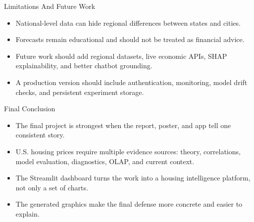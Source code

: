 \documentclass[aspectratio=169]{beamer}
\begin{document}
\begin{frame}{Limitations And Future Work}
\begin{itemize}
  \item National-level data can hide regional differences between states and cities.
  \item Forecasts remain educational and should not be treated as financial advice.
  \item Future work should add regional datasets, live economic APIs, SHAP explainability, and better chatbot grounding.
  \item A production version should include authentication, monitoring, model drift checks, and persistent experiment storage.
\end{itemize}
\end{frame}

\begin{frame}{Final Conclusion}
\begin{itemize}
  \item The final project is strongest when the report, poster, and app tell one consistent story.
  \item U.S. housing prices require multiple evidence sources: theory, correlations, model evaluation, diagnostics, OLAP, and current context.
  \item The Streamlit dashboard turns the work into a housing intelligence platform, not only a set of charts.
  \item The generated graphics make the final defense more concrete and easier to explain.
\end{itemize}
\end{frame}
\end{document}
